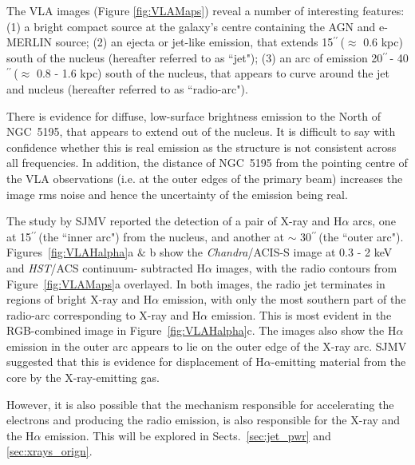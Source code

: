 \documentclass[fleqn,usenatbib]{mnras}
\def\fig{Figure}
\def\Fig{Figure}
\def\Figs{Figures}
\def\sects{Sects.}
\def\arcs{$^{\prime\prime}\,$}
\begin{document}
The VLA images (Figure \ref{fig:VLAMaps}) reveal a number of interesting features: (1) a bright compact source at the galaxy's centre containing the AGN and e-MERLIN source; (2) an ejecta or jet-like emission, that extends 15\arcs ($\approx$ 0.6 kpc) south of the nucleus (hereafter referred to as ``jet"); (3) an arc of emission 20\arcs - 40\arcs ($\approx$ 0.8 - 1.6 kpc) south of the nucleus, that appears to curve around the jet and nucleus (hereafter referred to as ``radio-arc"). 


There is evidence for diffuse, low-surface brightness emission to the North of NGC~5195, that appears 
to extend out of the nucleus. It is difficult to say with confidence whether this is real emission as 
the structure is not consistent across all frequencies. In addition, the distance of NGC~5195 from the pointing centre of the VLA observations (i.e. at the outer edges of the primary beam) increases the image rms noise and hence the uncertainty of the emission being real.

The study by SJMV reported the detection of a pair of X-ray and H$\alpha$ arcs, one at 15\arcs (the ``inner arc") from the nucleus, and  another at $\sim$ 30\arcs (the ``outer arc"). \Figs~\ref{fig:VLAHalpha}a $\&$ b show the \textit{Chandra}/ACIS-S image at 0.3 - 2 keV and \textit{HST}/ACS continuum-
subtracted H$\alpha$ images, with the radio contours from \fig~\ref{fig:VLAMaps}a overlayed.
In both images, the radio jet terminates in regions of bright X-ray and H$\alpha$ emission, with only the 
most southern part of the radio-arc corresponding to X-ray and H$\alpha$ emission. This is most evident in 
the RGB-combined image in \Fig~\ref{fig:VLAHalpha}c. {The images also show the H$\alpha$ emission in the outer arc appears to lie on the outer edge of the X-ray arc. SJMV suggested that this is evidence for displacement of H$\alpha$-emitting material from the core by the X-ray-emitting gas}. 

{However, it is also possible that the mechanism responsible for accelerating the electrons and producing the 
radio emission, is also responsible for the X-ray and the H$\alpha$ emission. This will be explored in \sects~\ref{sec:jet_pwr} and \ref{sec:xrays_orign}.}
\end{document}
